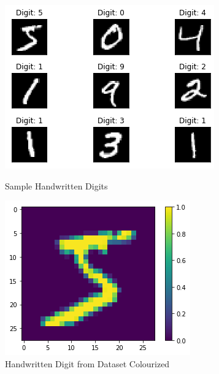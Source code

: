 \documentclass[11pt]{homework}
\begin{document}
\begin{figure}[h!]
  \centering
  \begin{minipage}[h]{0.3\textwidth}
    \includegraphics[width=\textwidth]{example-digits.png}
     \caption{Sample Handwritten Digits}
     \label{digits-png}
  \end{minipage}
\hfill
  \begin{minipage}[h]{0.3\textwidth}
    \includegraphics[width=\textwidth]{example-digit.png}
     \caption{Handwritten Digit from Dataset Colourized}
     \label{digit-png}
  \end{minipage}

\end{figure}
\end{document}
